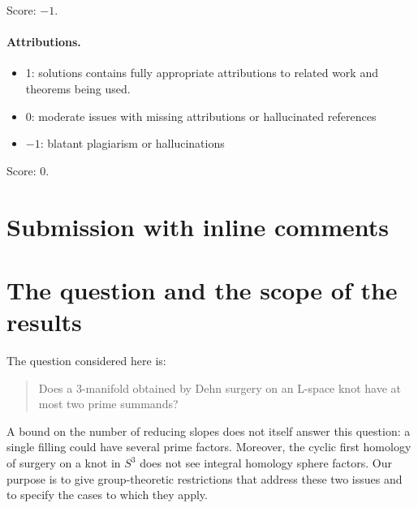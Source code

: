 \documentclass[11pt]{article}
\theoremstyle{remark}
\begin{document}
\noindent Score: $-1$. 

\paragraph{Attributions.}
\begin{itemize}
	\item  1: solutions contains fully appropriate attributions
		to related work and theorems being used.
	\item  0: moderate issues with missing attributions or hallucinated references
	\item  $-1$: blatant plagiarism or hallucinations
\end{itemize}

\noindent Score: $0$. 

\newpage
\section{Submission with inline comments}


\begin{abstract}
We study the question whether surgery on an L-space knot has at most two prime summands. For a fibered knot of genus $g\geq1$ in $S^3$, we prove that a nonzero rational surgery whose numerator has absolute value $2g-1$ has at most two nontrivial prime summands. The proof uses the free commutator subgroup of the knot group and explicit covers of free products; it retains integral homology sphere factors that first homology alone cannot detect. A related argument shows that a nonzero integer surgery with at least three summands on a fibered hyperbolic knot must satisfy $|p|\leq2g-1$. Together with the reducing-slope theorem of Hom--Lidman--Zufelt, the first result gives the two-summand bound for hyperbolic knots in $S^3$ admitting a mod-two L-space surgery. We also give a formal obstruction to a difference-only argument and explain the role of the ambient manifold through a Seifert-fibered example. These are partial results on the original question, not an all-knot, all-coefficient conclusion.
\end{abstract}

\section{The question and the scope of the results}

The question considered here is:
\begin{quote}
Does a $3$-manifold obtained by Dehn surgery on an L-space knot have at most two prime summands?
\end{quote}
A bound on the number of reducing slopes does not itself answer this question: a single filling could have several prime factors. Moreover, the cyclic first homology of surgery on a knot in $S^3$ does not see integral homology sphere factors. Our purpose is to give group-theoretic restrictions that address these two issues and to specify the cases to which they apply.
\end{document}
